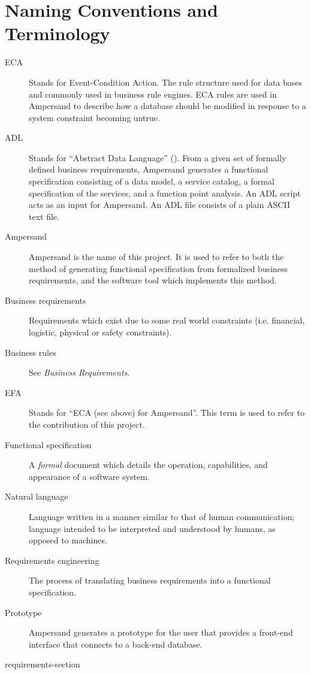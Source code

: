 \documentclass[journal,12pt,onecolumn,draftclsnofoot]{report}
\begin{document}
\section{Naming Conventions and Terminology}\label{sec:Naming} 
\begin{description}
    \item[ECA] Stands for Event-Condition Action. The rule structure used for 
    data
    bases and commonly used in  business rule engines. ECA rules are
    used in Ampersand to describe how a database should be modified in response 
    to
    a system constraint becoming untrue. 
    
    \item [ADL] Stands for ``Abstract Data Language''
      (\cite[13]{derFun}).
    From a given set of formally defined business requirements, Ampersand generates a
    functional specification consisting of a data model, a service catalog, a
    formal specification of the services, and a function point analysis. An ADL
    script acts as an input for Ampersand. An ADL file consists of a plain ASCII
    text file.
    
    \item [Ampersand] Ampersand is the name of this project.
    It is used to refer to
    both the method of generating functional specification from formalized
    business requirements, and the software tool which implements this method.
    
    \item [Business requirements] Requirements which exist due to some real 
    world 
    constraints (i.e. financial, logistic, physical or safety constraints). 
    
    \item [Business rules] See \emph{Business Requirements}.
    
    \item [EFA] Stands for ``ECA (see above) for Ampersand''. This term is used 
    to 
    refer to the contribution of this project. 
    
    \item [Functional specification] A \emph{formal} document which details the 
    operation,
    capabilities, and appearance of a software system. 
    
    \item [Natural language] Language written in a manner similar to that of 
    human 
    communication; language intended to be interpreted and understood by 
    humans, as 
    opposed to machines. 
    
    \item [Requirements engineering] The process of translating business
    requirements into a functional specification. 
    
    \item [Prototype] Ampersand generates a prototype for the user that 
    provides a 
    front-end interface that connects to a back-end database.
    
\end{description}

 {requirements-section}
\end{document}
